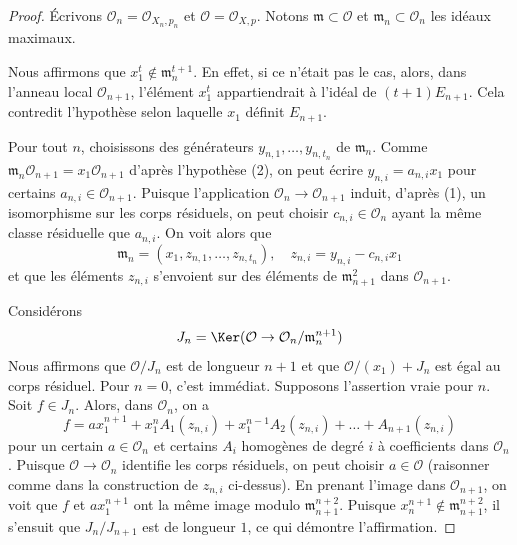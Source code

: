 \begin{proof} Écrivons $\mathcal{O}_n = \mathcal{O}_{X_n, p_n}$ et $\mathcal{O} = \mathcal{O}_{X, p}$. Notons $\mathfrak m \subset \mathcal{O}$ et $\mathfrak m_n \subset \mathcal{O}_n$ les idéaux maximaux.

\medskip\noindent Nous affirmons que $x_1^t \not \in \mathfrak m_n^{t + 1}$. En effet, si ce n'était pas le cas, alors, dans l'anneau local $\mathcal{O}_{n + 1}$, l'élément $x_1^t$ appartiendrait à l'idéal de $(t + 1)E_{n + 1}$. Cela contredit l'hypothèse selon laquelle $x_1$ définit $E_{n + 1}$.

\medskip\noindent Pour tout $n$, choisissons des générateurs $y_{n, 1}, \ldots, y_{n, t_n}$ de $\mathfrak m_n$. Comme $\mathfrak m_n \mathcal{O}_{n + 1} = x_1\mathcal{O}_{n + 1}$ d'après l'hypothèse (2), on peut écrire $y_{n, i} = a_{n, i} x_1$ pour certains $a_{n, i} \in \mathcal{O}_{n + 1}$. Puisque l'application $\mathcal{O}_n \to \mathcal{O}_{n + 1}$ induit, d'après (1), un isomorphisme sur les corps résiduels, on peut choisir $c_{n, i} \in \mathcal{O}_n$ ayant la même classe résiduelle que $a_{n, i}$. On voit alors que $$
\mathfrak m_n = (x_1, z_{n, 1}, \ldots, z_{n, t_n}),
\quad z_{n, i} = y_{n, i} - c_{n, i} x_1
$$ et que les éléments $z_{n, i}$ s'envoient sur des éléments de $\mathfrak m_{n + 1}^2$ dans $\mathcal{O}_{n + 1}$.

\medskip\noindent Considérons $$
J_n = \Ker(\mathcal{O} \to \mathcal{O}_n/\mathfrak m_n^{n + 1})
$$ Nous affirmons que $\mathcal{O}/J_n$ est de longueur $n + 1$ et que $\mathcal{O}/(x_1) + J_n$ est égal au corps résiduel. Pour $n = 0$, c'est immédiat. Supposons l'assertion vraie pour $n$. Soit $f \in J_n$. Alors, dans $\mathcal{O}_n$, on a $$
f = a x_1^{n + 1} + x_1^n A_1(z_{n, i}) +
x_1^{n - 1} A_2(z_{n, i}) + \ldots + A_{n + 1}(z_{n, i})
$$ pour un certain $a \in \mathcal{O}_n$ et certains $A_i$ homogènes de degré $i$ à coefficients dans $\mathcal{O}_n$. Puisque $\mathcal{O} \to \mathcal{O}_n$ identifie les corps résiduels, on peut choisir $a \in \mathcal{O}$ (raisonner comme dans la construction de $z_{n, i}$ ci-dessus). En prenant l'image dans $\mathcal{O}_{n + 1}$, on voit que $f$ et $a x_1^{n + 1}$ ont la même image modulo $\mathfrak m_{n + 1}^{n + 2}$. Puisque $x_n^{n + 1} \not \in \mathfrak m_{n + 1}^{n + 2}$, il s'ensuit que $J_n/J_{n + 1}$ est de longueur $1$, ce qui démontre l'affirmation.


\end{proof}
